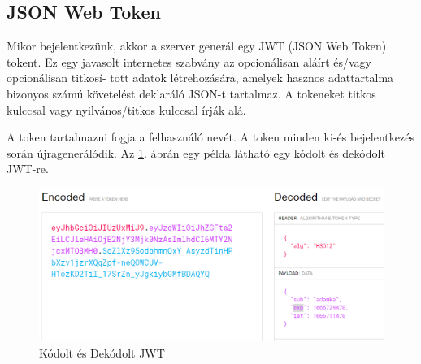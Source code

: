 \subsection{JSON Web Token}
Mikor bejelentkezünk, akkor a szerver generál egy JWT (JSON Web Token)\cite{JWTexample} tokent. Ez egy javasolt internetes szabvány az opcionálisan aláírt és/vagy opcionálisan titkosí-
tott adatok létrehozására, amelyek hasznos adattartalma bizonyos számú követelést deklaráló JSON-t tartalmaz. A tokeneket titkos kulccsal vagy nyilvános/titkos kulccsal írják alá.

A token tartalmazni fogja a felhasználó nevét. A token minden ki-és bejelentkezés során újragenerálódik. 
Az \ref{fig:JWT}. ábrán egy példa látható egy kódolt és dekódolt JWT-re.

\begin{figure}[h]
\centering
\includegraphics[scale=0.6]{images/jwt.io.png}
\caption{Kódolt és Dekódolt JWT \cite{JWTexample}}
\label{fig:JWT}
\end{figure}